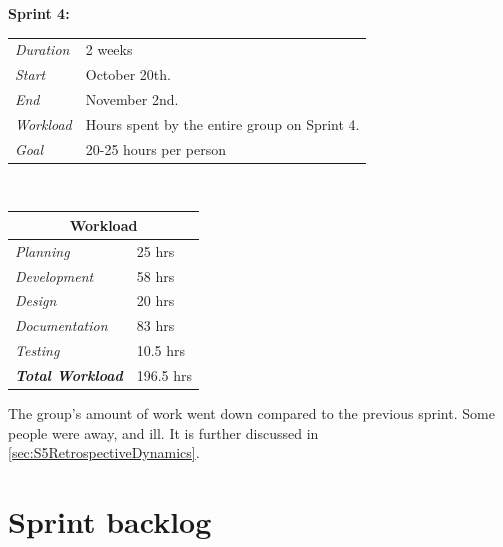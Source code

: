 \begin{minipage}{\linewidth}
\centering
\setlength{\tabcolsep}{22pt}
\textbf{Sprint 4:} 
\smallskip
{}
\begin{tabular}{ |l l| }
	\hline
	\it{Duration} & 2 weeks \\
	\it{Start} & October 20th. \\
	\it{End} & November 2nd. \\
	\it{Workload} & Hours spent by the entire group on Sprint 4. \\
	\it{Goal} & 20-25 hours per person \\
	\hline
\end{tabular}
\end{minipage}\\%
%
\begin{minipage}{\linewidth}
\setlength{\tabcolsep}{15pt}
\centering
{}
\begin{tabular}{ |l|l| }
	\hline
	\multicolumn{2}{|c|}{\cellcolor{gray!25} Workload} \\
	\hline
	\it{Planning} & 25 hrs\\
	\it{Development} & 58 hrs\\
	\it{Design} & 20 hrs\\
	\it{Documentation} & 83 hrs\\
	\it{Testing} & 10.5 hrs\\
	\hline
	\textbf{\textit{Total Workload}} & 196.5 hrs\\
	\hline
\end{tabular}
\end{minipage}

The group's amount of work went down compared to the previous sprint. Some people were away, and ill. It is further discussed in \ref{sec:S5RetrospectiveDynamics}.

\section{Sprint backlog}
\label{sec:S5Backlog}

